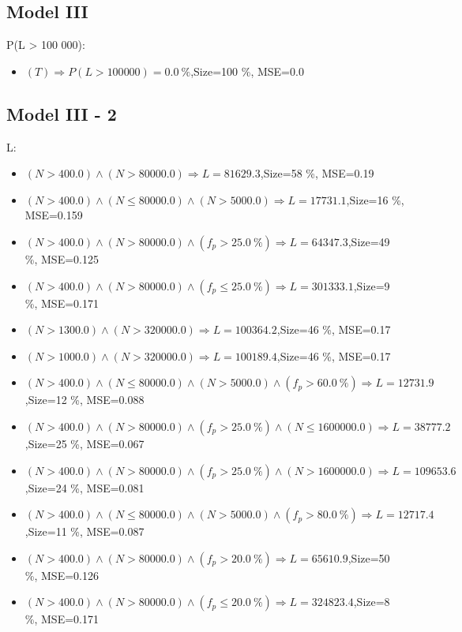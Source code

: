 \documentclass[numbered]{CSL}
\begin{document}
\subsection{Model III}
P(L > 100 000):
\begin{itemize}
\item $(T) \Rightarrow P(L > 100 000) = 0.0~\%$,\hfill Size=100 \%, MSE=0.0
\end{itemize}

\subsection{Model III - 2}
L:
\begin{itemize}
\item $(N > 400.0) \land (N > 80000.0) \Rightarrow L = 81629.3$,\hfill Size=58 \%, MSE=0.19
\item $(N > 400.0) \land (N \leq 80000.0) \land (N > 5000.0) \Rightarrow L = 17731.1$,\hfill Size=16 \%, MSE=0.159
\item $(N > 400.0) \land (N > 80000.0) \land (f_p > 25.0~\%) \Rightarrow L = 64347.3$,\hfill Size=49 \%, MSE=0.125
\item $(N > 400.0) \land (N > 80000.0) \land (f_p \leq 25.0~\%) \Rightarrow L = 301333.1$,\hfill Size=9 \%, MSE=0.171
\item $(N > 1300.0) \land (N > 320000.0) \Rightarrow L = 100364.2$,\hfill Size=46 \%, MSE=0.17
\item $(N > 1000.0) \land (N > 320000.0) \Rightarrow L = 100189.4$,\hfill Size=46 \%, MSE=0.17
\item $(N > 400.0) \land (N \leq 80000.0) \land (N > 5000.0) \land (f_p > 60.0~\%) \Rightarrow L = 12731.9$,\hfill Size=12 \%, MSE=0.088
\item $(N > 400.0) \land (N > 80000.0) \land (f_p > 25.0~\%) \land (N \leq 1600000.0) \Rightarrow L = 38777.2$,\hfill Size=25 \%, MSE=0.067
\item $(N > 400.0) \land (N > 80000.0) \land (f_p > 25.0~\%) \land (N > 1600000.0) \Rightarrow L = 109653.6$,\hfill Size=24 \%, MSE=0.081
\item $(N > 400.0) \land (N \leq 80000.0) \land (N > 5000.0) \land (f_p > 80.0~\%) \Rightarrow L = 12717.4$,\hfill Size=11 \%, MSE=0.087
\item $(N > 400.0) \land (N > 80000.0) \land (f_p > 20.0~\%) \Rightarrow L = 65610.9$,\hfill Size=50 \%, MSE=0.126
\item $(N > 400.0) \land (N > 80000.0) \land (f_p \leq 20.0~\%) \Rightarrow L = 324823.4$,\hfill Size=8 \%, MSE=0.171

\end{itemize}
\end{document}
